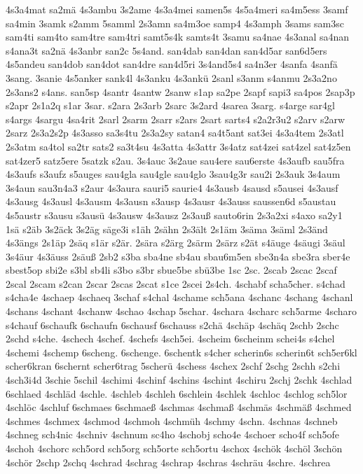 {4s3a4mat
sa2mä
4s3ambu
3s2ame
4s3a4mei
samen5s
4s5a4meri
sa4m5ess
3samf
sa4min
3samk
s2amm
5samml
2s3amn
sa4m3oe
samp4
4s3amph
3sams
sam3sc
sam4ti
sam4to
sam4tre
sam4tri
samt5s4k
samts4t
3samu
sa4nae
4s3anal
sa4nan
s4ana3t
sa2nä
4s3anbr
san2c
5s4and.
san4dab
san4dan
san4d5ar
san6d5ers
4s5andeu
san4dob
san4dot
san4dre
san4d5ri
3s4and5s4
sa4n3er
4sanfa
4sanfä
3sang.
3sanie
4s5anker
sank4l
4s3anku
4s3ankü
2sanl
s3anm
s4anmu
2s3a2no
2s3ans2
s4ans.
san5sp
4santr
4santw
2sanw
s1ap
sa2pe
2sapf
sapi3
sa4pos
2sap3p
s2apr
2s1a2q
s1ar
3sar.
s2ara
2s3arb
2sarc
3s2ard
4sarea
3sarg.
s4arge
sar4gl
s4args
4sargu
4sa4rit
2sarl
2sarm
2sarr
s2ars
2sart
sarts4
s2a2r3u2
s2arv
s2arw
2sarz
2s3a2s2p
4s3asso
sa3s4tu
2s3a2sy
satan4
sa4t5ant
sat3ei
4s3a4tem
2s3atl
2s3atm
sa4tol
sa2tr
sats2
sa3t4su
4s3atta
4s3attr
3s4atz
sat4zei
sat4zel
sat4z5en
sat4zer5
satz5ere
5satzk
s2au.
3s4auc
3s2aue
sau4ere
sau6erste
4s3aufb
sau5fra
4s3aufs
s3aufz
s5auges
sau4gla
sau4gle
sau4glo
3sau4g3r
sau2i
2s3auk
3s4aum
3s4aun
sau3n4a3
s2aur
4s3aura
sauri5
saurie4
4s3ausb
4sausd
s5ausei
4s3ausf
4s3ausg
4s3ausl
4s3ausm
4s3ausn
s3ausp
4s3ausr
4s3auss
saussen6d
s5austau
4s5austr
s3ausu
s3ausü
4s3ausw
4s3ausz
2s3auß
sauto6rin
2s3a2xi
s4axo
sa2y1
1sä
s2äb
3s2äck
3s2äg
säge3i
s1äh
2sähn
2s3ält
2s1äm
3säma
3säml
2s3änd
4s3ängs
2s1äp
2säq
s1är
s2är.
2sära
s2ärg
2särm
2särz
s2ät
s4äuge
4säugi
3säul
3s4äur
4s3äuss
2säuß
2sb2
s3ba
sba4ne
sb4au
sbau6m5en
sbe3n4a
sbe3ra
sber4e
sbest5op
sbi2e
s3bl
sb4li
s3bo
s3br
sbue5be
sbü3be
1sc
2sc.
2scab
2scac
2scaf
2scal
2scam
s2can
2scar
2scas
2scat
s1ce
2scei
2s4ch.
4schabf
scha5cher.
s4chad
s4cha4e
4schaep
4schaeq
3schaf
s4chal
4schame
sch5ana
4schanc
4schang
4schanl
4schans
4schant
4schanw
4schao
4schap
5schar.
4schara
4scharc
sch5arme
4scharo
s4chauf
6schaufk
6schaufn
6schausf
6schauss
s2chä
4schäp
4schäq
2schb
2schc
2schd
s4che.
4schech
4schef.
4schefs
4sch5ei.
4scheim
6scheinm
schei4s
s4chel
4schemi
4schemp
6scheng.
6schenge.
6schentk
s4cher
scherin6s
scherin6t
sch5er6kl
scher6kran
6schernt
scher6trag
5scherü
4schess
4schex
2schf
2schg
2schh
s2chi
4sch3i4d
3schie
5schil
4schimi
4schinf
4schins
4schint
4schiru
2schj
2schk
4schlad
6schlaed
4schläd
4schle.
4schleb
4schleh
6schlein
4schlek
4schloc
4schlog
sch5lor
4schlöc
4schluf
6schmaes
6schmaeß
4schmas
4schmaß
4schmäs
4schmäß
4schmed
4schmes
4schmex
4schmod
4schmoh
4schmüh
4schmy
4schn.
4schnas
4schneb
4schneg
sch4nic
4schniv
4schnum
sc4ho
4schobj
scho4e
4schoer
scho4f
sch5ofe
4schoh
4schorc
sch5ord
sch5org
sch5orte
sch5ortu
4schox
4schök
4schöl
3schön
4schör
2schp
2schq
4schrad
4schrag
4schrap
4schras
4schräu
4schre.
4schrea
}
